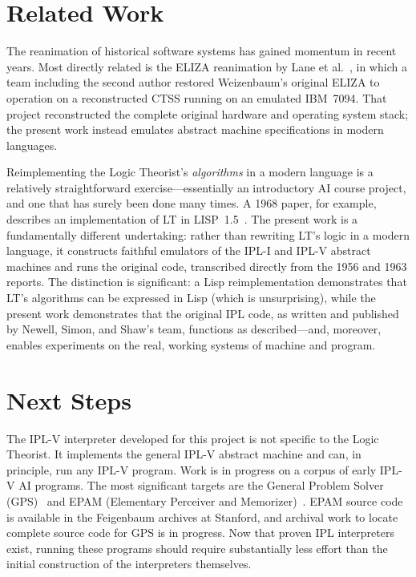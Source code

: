 \documentclass[journal]{IEEEtran}
\begin{document}
\section{Related Work}
\label{sec:related}

The reanimation of historical software systems has gained momentum in
recent years. Most directly related is the ELIZA reanimation by Lane
et al.~\cite{lane2025eliza}, in which a team including the second
author restored Weizenbaum's original ELIZA to operation on a
reconstructed CTSS running on an emulated IBM~7094. That project
reconstructed the complete original hardware and operating system
stack; the present work instead emulates abstract machine
specifications in modern languages.

Reimplementing the Logic Theorist's \textit{algorithms} in a modern
language is a relatively straightforward exercise---essentially an
introductory AI course project, and one that has surely been done many
times. A 1968 paper, for example, describes an implementation of LT in
LISP~1.5~\cite{millstein1968logic}. The present work is a
fundamentally different undertaking: rather than rewriting LT's logic
in a modern language, it constructs faithful emulators of the IPL-I
and IPL-V abstract machines and runs the original code, transcribed
directly from the 1956 and 1963 reports. The distinction is
significant: a Lisp reimplementation demonstrates that LT's algorithms
can be expressed in Lisp (which is unsurprising), while the present
work demonstrates that the original IPL code, as written and published
by Newell, Simon, and Shaw's team, functions as described---and,
moreover, enables experiments on the real, working systems of machine
and program.

\section{Next Steps}
\label{sec:next}

The IPL-V interpreter developed for this project is not specific to
the Logic Theorist. It implements the general IPL-V abstract machine
and can, in principle, run any IPL-V program. Work is in progress on
a corpus of early IPL-V AI programs. The most significant targets are
the General Problem Solver (GPS)~\cite{newell1959gps} and EPAM
(Elementary Perceiver and Memorizer)~\cite{feigenbaum1961epam}. EPAM
source code is available in the Feigenbaum archives at Stanford, and
archival work to locate complete source code for GPS is in progress.
Now that proven IPL interpreters exist, running these programs should
require substantially less effort than the initial construction of
the interpreters themselves.
\end{document}
